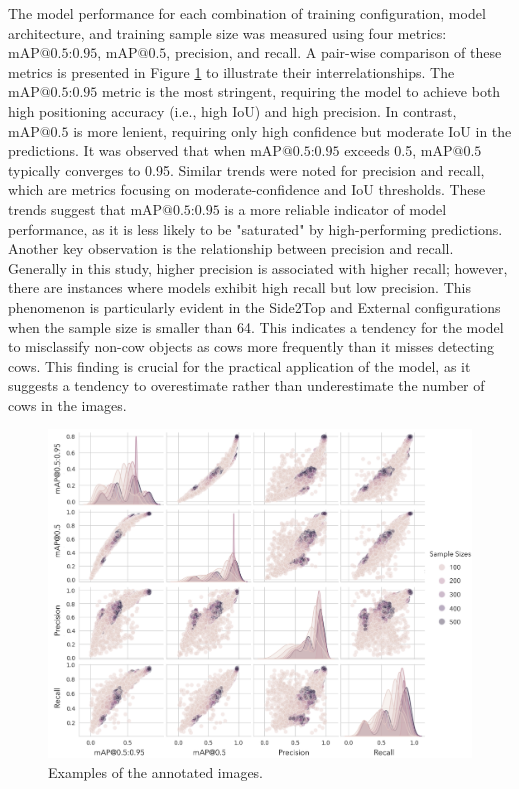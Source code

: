 The model performance for each combination of training configuration, model architecture, and training sample size was measured using four metrics: $\text{mAP@{0.5:0.95}}$, $\text{mAP@{0.5}}$, precision, and recall. A pair-wise comparison of these metrics is presented in Figure \ref{fig:metrics} to illustrate their interrelationships. The $\text{mAP@{0.5:0.95}}$ metric is the most stringent, requiring the model to achieve both high positioning accuracy (i.e., high IoU) and high precision. In contrast, $\text{mAP@{0.5}}$ is more lenient, requiring only high confidence but moderate IoU in the predictions. It was observed that when $\text{mAP@{0.5:0.95}}$ exceeds 0.5, $\text{mAP@{0.5}}$ typically converges to 0.95. Similar trends were noted for precision and recall, which are metrics focusing on moderate-confidence and IoU thresholds. These trends suggest that $\text{mAP@{0.5:0.95}}$ is a more reliable indicator of model performance, as it is less likely to be "saturated" by high-performing predictions. Another key observation is the relationship between precision and recall. Generally in this study, higher precision is associated with higher recall; however, there are instances where models exhibit high recall but low precision. This phenomenon is particularly evident in the Side2Top and External configurations when the sample size is smaller than 64. This indicates a tendency for the model to misclassify non-cow objects as cows more frequently than it misses detecting cows. This finding is crucial for the practical application of the model, as it suggests a tendency to overestimate rather than underestimate the number of cows in the images.

\begin{figure}[H]
    \centering
    \includegraphics[width=1\textwidth]{figure_s1.jpg}
    \caption{Examples of the annotated images.}
    \label{fig:metrics}
\end{figure}



